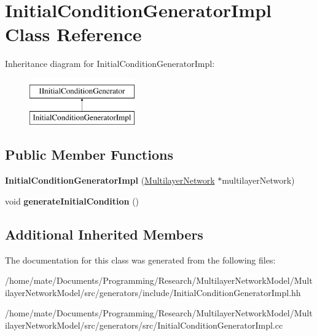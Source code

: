 \hypertarget{classInitialConditionGeneratorImpl}{}\section{Initial\+Condition\+Generator\+Impl Class Reference}
\label{classInitialConditionGeneratorImpl}
Inheritance diagram for Initial\+Condition\+Generator\+Impl\+:\begin{figure}[H]
\begin{center}
\leavevmode
\includegraphics[height=2.000000cm]{classInitialConditionGeneratorImpl}
\end{center}
\end{figure}
\subsection*{Public Member Functions}
\begin{DoxyCompactItemize}
\item 
{\bfseries Initial\+Condition\+Generator\+Impl} (\hyperlink{classMultilayerNetwork}{Multilayer\+Network} $\ast$multilayer\+Network)\hypertarget{classInitialConditionGeneratorImpl_a07647da5a3eece4804a53135bb54c738}{}\label{classInitialConditionGeneratorImpl_a07647da5a3eece4804a53135bb54c738}

\item 
void {\bfseries generate\+Initial\+Condition} ()\hypertarget{classInitialConditionGeneratorImpl_ab296cde00693ad9b2b0199c69a3c3326}{}\label{classInitialConditionGeneratorImpl_ab296cde00693ad9b2b0199c69a3c3326}

\end{DoxyCompactItemize}
\subsection*{Additional Inherited Members}


The documentation for this class was generated from the following files\+:\begin{DoxyCompactItemize}
\item 
/home/mate/\+Documents/\+Programming/\+Research/\+Multilayer\+Network\+Model/\+Multilayer\+Network\+Model/src/generators/include/Initial\+Condition\+Generator\+Impl.\+hh\item 
/home/mate/\+Documents/\+Programming/\+Research/\+Multilayer\+Network\+Model/\+Multilayer\+Network\+Model/src/generators/src/Initial\+Condition\+Generator\+Impl.\+cc\end{DoxyCompactItemize}
